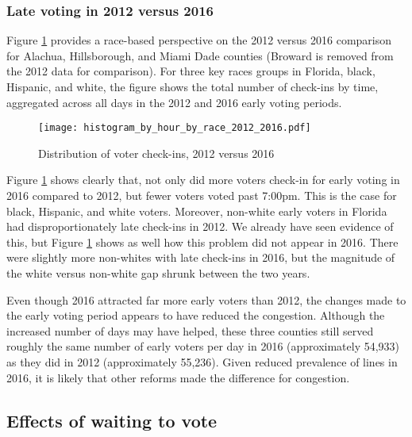 \documentclass[12pt,titlepage]{article}
\begin{document}
\subsubsection*{Late voting in 2012 versus 2016}

Figure \ref{fig:race2012and2016} provides a race-based perspective on
the 2012 versus 2016 comparison for Alachua, Hillsborough, and Miami
Dade counties (Broward is removed from the 2012 data for comparison).
For three key races groups in Florida, black, Hispanic, and white, the
figure shows the total number of check-ins by time, aggregated across
all days in the 2012 and 2016 early voting periods.

\begin{figure}[!ht]
  \caption{Distribution of voter check-ins, 2012 versus 2016}
  \label{fig:race2012and2016}
  \centering
  \centering\texttt{[image: histogram\_by\_hour\_by\_race\_2012\_2016.pdf]}
\end{figure}

Figure \ref{fig:race2012and2016} shows clearly that, not only did more
voters check-in for early voting in 2016 compared to 2012, but fewer
voters voted past 7:00pm.  This is the case for black, Hispanic, and
white voters. Moreover, non-white early voters in Florida had
disproportionately late check-ins in 2012.  We already have seen
evidence of this, but Figure \ref{fig:race2012and2016} shows as well
how this problem did not appear in 2016.  There were slightly more
non-whites with late check-ins in 2016, but the magnitude of the white
versus non-white gap shrunk between the two years.

Even though 2016 attracted far more early voters than 2012, the
changes made to the early voting period appears to have reduced the
congestion. Although the increased number of days may have helped,
these three counties still served roughly the same number of early
voters per day in 2016 (approximately 54,933) as they did in 2012
(approximately 55,236).  Given reduced prevalence of lines in 2016, it
is likely that other reforms made the difference for congestion.




\subsection*{Effects of waiting to vote}
\end{document}

